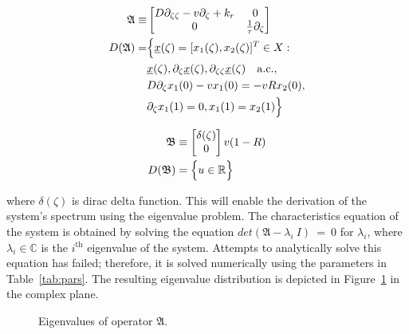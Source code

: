 \begin{equation} \label{eq:operator_A}
    \begin{aligned}
        \mathfrak{A} \equiv&
        \begin{bmatrix}
            D \partial_{\zeta \zeta} - v \partial_\zeta + k_r & 0 \\
            0 & \frac{1}{\tau} \partial_\zeta
        \end{bmatrix}\\
        D(\mathfrak{A}) =& \Bigl\{ \underline{x}(\zeta) = [x_1(\zeta), x_2(\zeta)]^T \in X:\\
        &\underline{x}(\zeta), \partial_\zeta \underline{x}(\zeta), \partial_{\zeta \zeta} \underline{x}(\zeta) \quad \mathrm{a.c.},\\
        &D \partial_\zeta x_1(0) - v x_1(0) = -v R x_2(0),\\
        &\partial_\zeta x_1(1) = 0,
        x_1(1) = x_2(1) \Bigr\}
    \end{aligned}
\end{equation}

\begin{equation} \label{eq:operator_B}
    \begin{aligned}
        \mathfrak{B} &\equiv
        \begin{bmatrix}
            \delta(\zeta) \\
            0
        \end{bmatrix} v (1-R) \\
        D(\mathfrak{B}) &= \Bigl\{ u \in \mathbb{R} \Bigr\}
    \end{aligned}
\end{equation}

where $\delta(\zeta)$ is dirac delta function. This will enable the derivation of the system's spectrum using the eigenvalue problem. The characteristics equation of the system is obtained by solving the equation $det(\mathfrak{A}-\lambda_i~I)~=~0$ for $\lambda_i$, where $\lambda_i \in \mathbb{C}$ is the $i^{\text{th}}$ eigenvalue of the system. Attempts to analytically solve this equation has failed; therefore, it is solved numerically using the parameters in Table~\ref{tab:pars}. The resulting eigenvalue distribution is depicted in Figure~\ref{fig:eigval_dist} in the complex plane.

\begin{figure}[!htbp]
    \centering
    
    \caption{Eigenvalues of operator $\mathfrak{A}$.}
    \label{fig:eigval_dist}
\end{figure}


